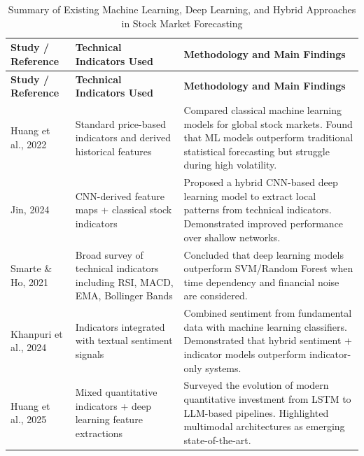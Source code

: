\begin{small}
\begin{longtable}{|p{3.2cm}|p{4.5cm}|p{7.2cm}|}
\caption{Summary of Existing Machine Learning, Deep Learning, and Hybrid Approaches in Stock Market Forecasting}
\label{tab:relatedwork} \\

\hline
\textbf{Study / Reference} & \textbf{Technical Indicators Used} & \textbf{Methodology and Main Findings} \\ \hline
\endfirsthead

\hline
\textbf{Study / Reference} & \textbf{Technical Indicators Used} & \textbf{Methodology and Main Findings} \\ \hline
\endhead

Huang et al., 2022 \cite{Huang2022PredictiveModeling} &
Standard price-based indicators and derived historical features &
Compared classical machine learning models for global stock markets. Found that ML models outperform traditional statistical forecasting but struggle during high volatility. \\ \hline

Jin, 2024 \cite{Jin2024CNNStockMarket} &
CNN-derived feature maps + classical stock indicators &
Proposed a hybrid CNN-based deep learning model to extract local patterns from technical indicators. Demonstrated improved performance over shallow networks. \\ \hline

Smarte \& Ho, 2021 \cite{Smarte2021ReviewOfMachineLearning} &
Broad survey of technical indicators including RSI, MACD, EMA, Bollinger Bands &
Concluded that deep learning models outperform SVM/Random Forest when time dependency and financial noise are considered. \\ \hline

Khanpuri et al., 2024 \cite{Khanpuri2024SentimentAnalysis} &
Indicators integrated with textual sentiment signals &
Combined sentiment from fundamental data with machine learning classifiers. Demonstrated that hybrid sentiment + indicator models outperform indicator-only systems. \\ \hline

Huang et al., 2025 \cite{Huang2025DeepLearning} &
Mixed quantitative indicators + deep learning feature extractions &
Surveyed the evolution of modern quantitative investment from LSTM to LLM-based pipelines. Highlighted multimodal architectures as emerging state-of-the-art. \\ \hline


\end{longtable}
\end{small}
